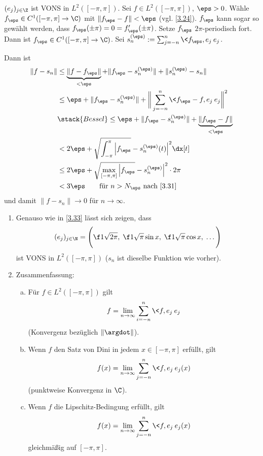 \begin{st} \label{3.33}
	$(e_j)_{j\in \Z}$ ist VONS in $L^2([-\pi,\pi])$.
	Sei $f \in L^2([-\pi,\pi])$, $\eps > 0$. 
	Wähle $f_\eps \in C^1([-\pi,\pi] \to \C)$ mit $\|f_\eps - f\| < \eps$ (vgl. \ref{3.24}).
	$f_\eps$ kann sogar so gewählt werden, dass $f_\eps(\pm\pi) = 0 = f_\eps'(\pm \pi)$.
	Setze $f_\eps$ $2\pi$-periodisch fort. 
	Dann ist $f_\eps \in C^1([-\pi,\pi] \to \C)$.
	Sei $s_n^{(\eps)} := \sum_{j=-n}^n \<f_\eps, e_j\> e_j$. 

	Dann ist
	\begin{align*}
		\|f - s_n\| 
		&\le \underbrace{\|f - f_\eps\|}_{<\eps} + \|f_\eps - s_n^{(\eps)}\| + \|s_n^{(\eps)} - s_n\| \\
		&\le \eps + \|f_\eps - s_n^{(\eps)}\| + \bigg\| \sum_{j=-n}^n \<f_\eps - f, e_j\> e_j \bigg\|^2 \\
		&\stack{Bessel}\le \eps + \|f_\eps - s_n^{(\eps)}\| + \underbrace{\|f_\eps - f\|}_{<\eps} \\
		&< 2\eps + \sqrt{\int_{-\pi}^\pi \Big|f_\eps} - s_n^{(\eps)}(t)\Big|^2 \dx[t] \\
		&\le 2\eps + \sqrt{\max_{[-\pi,\pi]} \Big|f_\eps} - s_n^{(\eps)}\Big|^2 \cdot 2\pi \\
		&< 3\eps  \qquad \text{für $n > N_\eps$ nach \ref{3.31}} \\
	\end{align*}
	und damit $\|f - s_n\| \to 0$ für $n \to \infty$.
\end{st}

\begin{nt} \label{3.34}
	\begin{enumerate}[1)]
		\item
			Genauso wie in \ref{3.33} lässt sich zeigen, dass
			\[
				(e_j)_{j\in \N} = \Bigg( \f 1{\sqrt{2\pi}}, \; \f 1{\sqrt{\pi}} \sin x,\; \f 1{\sqrt{\pi}} \cos x,\; \dotsc \Bigg)
			\]
			ist VONS in $L^2([-\pi,\pi])$ ($s_n$ ist dieselbe Funktion wie vorher).
		\item
			Zusammenfassung:
			\begin{enumerate}[a)]
				\item
					Für $f \in L^2([-\pi,\pi])$ gilt
					\[
						f = \lim_{n\to \infty} \sum_{i=-n}^n \<f,e_j\> e_j
					\]
					(Konvergenz bezüglich $\|\argdot\|$).
				\item
					Wenn $f$ den Satz von Dini in jedem $x\in [-\pi,\pi]$ erfüllt, gilt
					\[
						f(x) = \lim_{n\to \infty} \sum_{j=-n}^n \<f,e_j\> e_j(x)
					\]
					(punktweise Konvergenz in $\C$).
				\item
					Wenn $f$ die Lipschitz-Bedingung erfüllt, gilt
					\[
						f(x) = \lim_{n\to\infty} \sum_{j=-n}^n \<f,e_j\> e_j(x)
					\]
					gleichmäßig auf $[-\pi,\pi]$.
			\end{enumerate}
	\end{enumerate}
\end{nt}

